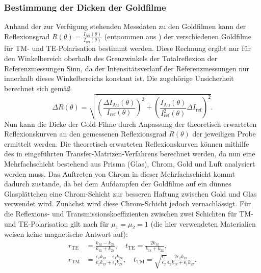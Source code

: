 \subsubsection*{Bestimmung der Dicken der Goldfilme}
Anhand der zur Verfügung stehenden Messdaten zu den Goldfilmen kann der Reflexionsgrad $R(\theta) = \frac{I_{\mathrm{Au}}(\theta)}{I_{\mathrm{ref}}(\theta)}$ (entnommen aus \cite{skript})
der verschiedenen Goldfilme für TM- und TE-Polarisation bestimmt werden. Diese Rechnung ergibt nur für den Winkelbereich oberhalb des Grenzwinkels der Totalreflexion
der Referenzmessungen Sinn, da der Intensitätsverlauf der Referenzmessungen nur innerhalb dieses Winkelbereichs konstant ist. Die zugehörige Unsicherheit berechnet sich gemäß
\begin{equation*}
    \Delta R(\theta) = \sqrt{\left(\frac{\Delta I_{\mathrm{Au}}(\theta)}{I_{\mathrm{ref}}(\theta)}\right)^2 + \left(\frac{I_{\mathrm{Au}}(\theta)}{I_{\mathrm{ref}}^2(\theta)}\Delta I_{\mathrm{ref}}\right)^2} .
\end{equation*} Nun kann die Dicke der Gold-Filme durch Anpassung der theoretisch erwarteten Reflexionskurven an den gemessenen Reflexionsgrad $R(\theta)$ der
jeweiligen Probe ermittelt werden. Die theoretisch erwarteten Reflexionskurven können mithilfe des in \cite{nano} eingeführten Transfer-Matrizen-Verfahrens
berechnet werden, da nun eine Mehrfachschicht bestehend aus Prisma (Glas), Chrom, Gold und Luft analysiert werden muss. Das Auftreten von Chrom in dieser Mehrfachschicht
kommt dadurch zustande, da bei dem Aufdampfen der Goldfilme auf ein dünnes Glasplättchen eine Chrom-Schicht zur besseren Haftung zwischen Gold und Glas verwendet wird.
Zunächst wird diese Chrom-Schicht jedoch vernachlässigt. Für die Reflexions- und Transmissionskoeffizienten zwischen zwei Schichten für TM- und TE-Polarisation gilt nach \cite{nano}
für $\mu_1 = \mu_2 = 1$ (die hier verwendeten Materialien weisen keine magnetische Antwort auf):
\begin{align}
    r_{\mathrm{TE}} &= \frac{k_{\mathrm{1z}} - k_{\mathrm{2z}}}{k_{\mathrm{1z}} + k_{\mathrm{2z}}} , \quad t_{\mathrm{TE}} = \frac{2k_{\mathrm{1z}}}{k_{\mathrm{1z}} + k_{\mathrm{2z}}} , \\
    r_{\mathrm{TM}} &= \frac{\epsilon_2 k_{\mathrm{1z}} - \epsilon_1 k_{\mathrm{2z}}}{\epsilon_2 k_{\mathrm{1z}} + \epsilon_1 k_{\mathrm{2z}}} , \quad t_{\mathrm{TM}} = \sqrt{\frac{\epsilon_1}{\epsilon_2}} \frac{2\epsilon_2 k_{\mathrm{1z}}}{\epsilon_2 k_{\mathrm{1z}} + \epsilon_1 k_{\mathrm{2z}}}\label{eq:reflexion_tm} .
\end{align} 
